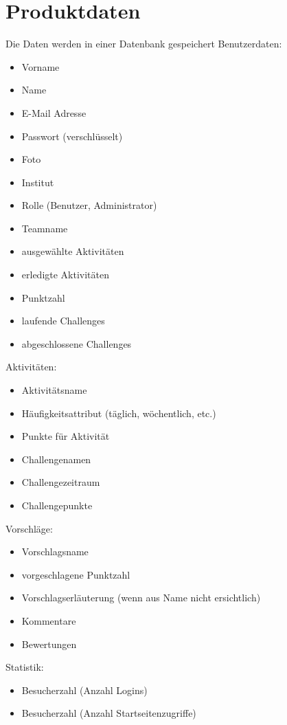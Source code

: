 \section{Produktdaten}
Die Daten werden in einer Datenbank gespeichert 
Benutzerdaten: 
\begin{itemize}
\item Vorname
\item Name
\item E-Mail Adresse
\item Passwort (verschlüsselt)
\item Foto
\item Institut
\item Rolle (Benutzer, Administrator)
\item Teamname
\item ausgewählte Aktivitäten
\item erledigte Aktivitäten
\item Punktzahl
\item laufende Challenges
\item abgeschlossene Challenges
\end{itemize}

Aktivitäten: 
\begin{itemize}
\item Aktivitätsname
\item Häufigkeitsattribut (täglich, wöchentlich, etc.)
\item Punkte für Aktivität
\item Challengenamen
\item Challengezeitraum
\item Challengepunkte
\end{itemize}

Vorschläge:
\begin{itemize}
\item Vorschlagsname
\item vorgeschlagene Punktzahl
\item Vorschlagserläuterung (wenn aus Name nicht ersichtlich)
\item Kommentare
\item Bewertungen
\end{itemize}

Statistik:
\begin{itemize}
\item Besucherzahl (Anzahl Logins)
\item Besucherzahl (Anzahl Startseitenzugriffe)
\end{itemize}






